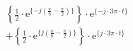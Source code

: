 \[
\begin{split}
&  \left \{ \frac{1}{2} \cdot \textrm{e}^{\{-j (\frac{\pi}{8}-\frac{\pi}{2}) \}} \right \} \cdot \textrm{e}^{\{-j \cdot 3\pi \cdot t \}} \\
&+ \left \{ \frac{1}{2} \cdot \textrm{e}^{\{j (\frac{\pi}{8}-\frac{\pi}{2}) \}} \right \} \cdot \textrm{e}^{\{j \cdot 3\pi \cdot t \}}
\end{split}
\]
